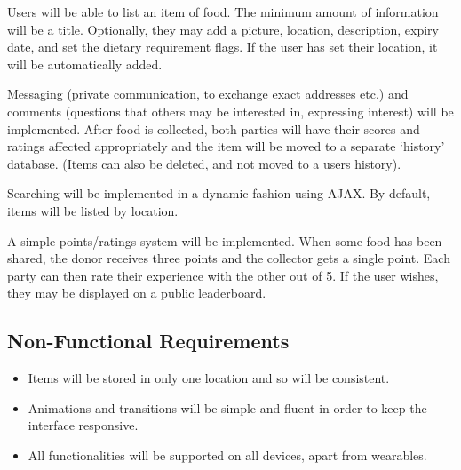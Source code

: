 \documentclass[12pt]{article}
\begin{document}


















Users will be able to list an item of food. The minimum amount of information
will be a title. Optionally, they may add a picture, location, description,
expiry date, and set the dietary requirement flags. If the user has set their
location, it will be automatically added.

Messaging (private communication, to exchange exact addresses etc.) and
comments (questions that others may be interested in, expressing interest)
will be implemented.
After food is collected, both parties will have their
scores and ratings affected appropriately and the item will be moved to a
separate ‘history’ database.
(Items can also be deleted, and not moved to a users history).

Searching will be implemented in a dynamic fashion using AJAX. By default,
items will be listed by location.

A simple points/ratings system will be implemented. When some food has been
shared, the donor receives three points and the collector gets a single point.
Each party can then rate their experience with the other out of 5.
If the user wishes, they may be displayed on a public leaderboard.


\subsection{Non-Functional Requirements}
\begin{itemize}
    \item Items will be stored in only one location and so will be consistent.
    \item Animations and transitions will be simple and fluent in order to keep
        the interface responsive.
    \item All functionalities will be supported on all devices, apart from
        wearables.
\end{itemize}
\end{document}
